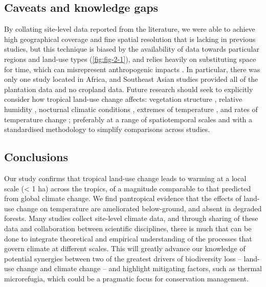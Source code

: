 \documentclass[12pt,a4paper,]{report}
\theoremstyle{definition}
\theoremstyle{definition}
\theoremstyle{definition}
\theoremstyle{remark}
\begin{document}
\subsection{Caveats and knowledge
gaps}\label{caveats-and-knowledge-gaps}

By collating site-level data reported from the literature, we were able
to achieve high geographical coverage and fine spatial resolution that
is lacking in previous studies, but this technique is biased by the
availability of data towards particular regions and land-use types
(\autoref{fig:fig-2-1}), and relies heavily on substituting space for
time, which can misrepresent anthropogenic impacts
\citep{franca_space-for-time_2016}. In particular, there was only one
study located in Africa, and Southeast Asian studies provided all of the
plantation data and no cropland data. Future research should seek to
explicitly consider how tropical land-use change affects: vegetation
structure \citep[e.g.~using Leaf Area Index
cf.][]{hardwick_relationship_2015}, relative humidity
\citep{luskin_microclimate_2011, ewers_fragmentation_2013}, nocturnal
climatic conditions
\citep{chen_growing-season_1995, dubreuil_impact_2011}, extremes of
temperature \citep{christidis_role_2013}, and rates of temperature
change \citep{scheffers_microhabitats_2014-1}; preferably at a range of
spatiotemporal scales \citep{wiens_matching_2010} and with a
standardised methodology to simplify comparisons across studies.

\subsection{Conclusions}\label{conclusions}

Our study confirms that tropical land-use change leads to warming at a
local scale (\textless{} 1 ha) across the tropics, of a magnitude
comparable to that predicted from global climate change. We find
pantropical evidence that the effects of land-use change on temperature
are ameliorated below-ground, and absent in degraded forests. Many
studies collect site-level climate data, and through sharing of these
data and collaboration between scientific disciplines, there is much
that can be done to integrate theoretical and empirical understanding of
the processes that govern climate at different scales. This will greatly
advance our knowledge of potential synergies between two of the greatest
drivers of biodiversity loss -- land-use change and climate change --
and highlight mitigating factors, such as thermal microrefugia, which
could be a pragmatic focus for conservation management.
\end{document}
